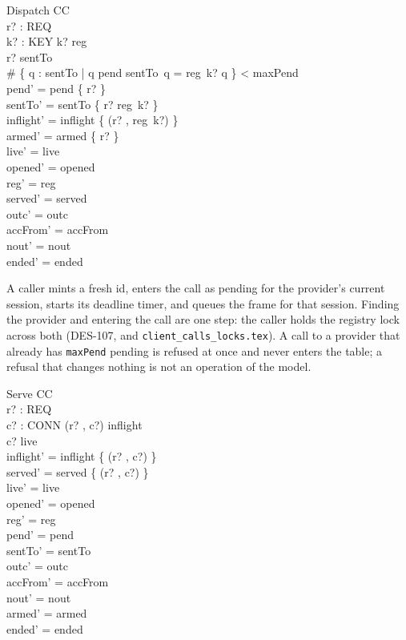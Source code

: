 \documentclass[a4paper,10pt,fleqn]{article}
\begin{document}
\begin{schema}{Dispatch}
  \Delta CC \\
  r? : REQ \\
  k? : KEY
\where
  k? \in \dom reg \\
  r? \notin \dom sentTo \\
  \# \{ q : \dom sentTo | q \in pend \land sentTo~q = reg~k? \spot q \}
    < maxPend \\
  pend' = pend \cup \{ r? \} \\
  sentTo' = sentTo \cup \{ r? \mapsto reg~k? \} \\
  inflight' = inflight \cup \{ (r? , reg~k?) \} \\
  armed' = armed \cup \{ r? \} \\
  live' = live \\
  opened' = opened \\
  reg' = reg \\
  served' = served \\
  outc' = outc \\
  accFrom' = accFrom \\
  nout' = nout \\
  ended' = ended
\end{schema}

A caller mints a fresh id, enters the call as pending for the provider's
current session, starts its deadline timer, and queues the frame for that
session.  Finding the provider and entering the call are one step: the
caller holds the registry lock across both (DES-107, and
\texttt{client\_calls\_locks.tex}).  A call to a provider that already has
\texttt{maxPend} pending is refused at once and never enters the table; a
refusal that changes nothing is not an operation of the model.

\begin{schema}{Serve}
  \Delta CC \\
  r? : REQ \\
  c? : CONN
\where
  (r? , c?) \in inflight \\
  c? \in live \\
  inflight' = inflight \setminus \{ (r? , c?) \} \\
  served' = served \cup \{ (r? , c?) \} \\
  live' = live \\
  opened' = opened \\
  reg' = reg \\
  pend' = pend \\
  sentTo' = sentTo \\
  outc' = outc \\
  accFrom' = accFrom \\
  nout' = nout \\
  armed' = armed \\
  ended' = ended
\end{schema}
\end{document}
